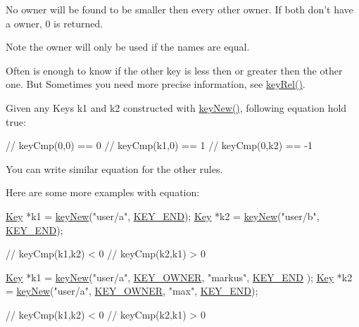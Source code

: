 \begin{DoxyItemize}
\item No owner will be found to be smaller then every other owner. If both don't have a owner, 0 is returned.
\end{DoxyItemize}

\begin{DoxyNote}{Note}
the owner will only be used if the names are equal.
\end{DoxyNote}
Often is enough to know if the other key is less then or greater then the other one. But Sometimes you need more precise information, see \hyperlink{group__keytest_ga6bb0f95ac34ce9c42d61bb35a76139d0}{key\-Rel()}.

Given any Keys k1 and k2 constructed with \hyperlink{group__key_gaf6893c038b3ebee90c73a9ea8356bebf}{key\-New()}, following equation hold true\-:


\begin{DoxyCode}
\textcolor{comment}{// keyCmp(0,0) == 0}
\textcolor{comment}{// keyCmp(k1,0) ==  1}
\textcolor{comment}{// keyCmp(0,k2) == -1}
\end{DoxyCode}


You can write similar equation for the other rules.

Here are some more examples with equation\-: 
\begin{DoxyCode}
\hyperlink{classkdb_1_1Key_a5679f5cae63caddd64a60388b9cc77fa}{Key} *k1 = \hyperlink{group__key_gaf6893c038b3ebee90c73a9ea8356bebf}{keyNew}(\textcolor{stringliteral}{"user/a"}, \hyperlink{group__key_gga91fb3178848bd682000958089abbaf40aa8adb6fcb92dec58fb19410eacfdd403}{KEY\_END});
\hyperlink{classkdb_1_1Key_a5679f5cae63caddd64a60388b9cc77fa}{Key} *k2 = \hyperlink{group__key_gaf6893c038b3ebee90c73a9ea8356bebf}{keyNew}(\textcolor{stringliteral}{"user/b"}, \hyperlink{group__key_gga91fb3178848bd682000958089abbaf40aa8adb6fcb92dec58fb19410eacfdd403}{KEY\_END});

\textcolor{comment}{// keyCmp(k1,k2) < 0}
\textcolor{comment}{// keyCmp(k2,k1) > 0}
\end{DoxyCode}



\begin{DoxyCode}
\hyperlink{classkdb_1_1Key_a5679f5cae63caddd64a60388b9cc77fa}{Key} *k1 = \hyperlink{group__key_gaf6893c038b3ebee90c73a9ea8356bebf}{keyNew}(\textcolor{stringliteral}{"user/a"}, \hyperlink{group__key_gga91fb3178848bd682000958089abbaf40a77ca60362fa8daca8d5347db4385068b}{KEY\_OWNER}, \textcolor{stringliteral}{"markus"}, \hyperlink{group__key_gga91fb3178848bd682000958089abbaf40aa8adb6fcb92dec58fb19410eacfdd403}{KEY\_END}
      );
\hyperlink{classkdb_1_1Key_a5679f5cae63caddd64a60388b9cc77fa}{Key} *k2 = \hyperlink{group__key_gaf6893c038b3ebee90c73a9ea8356bebf}{keyNew}(\textcolor{stringliteral}{"user/a"}, \hyperlink{group__key_gga91fb3178848bd682000958089abbaf40a77ca60362fa8daca8d5347db4385068b}{KEY\_OWNER}, \textcolor{stringliteral}{"max"}, \hyperlink{group__key_gga91fb3178848bd682000958089abbaf40aa8adb6fcb92dec58fb19410eacfdd403}{KEY\_END});

\textcolor{comment}{// keyCmp(k1,k2) < 0}
\textcolor{comment}{// keyCmp(k2,k1) > 0}
\end{DoxyCode}


